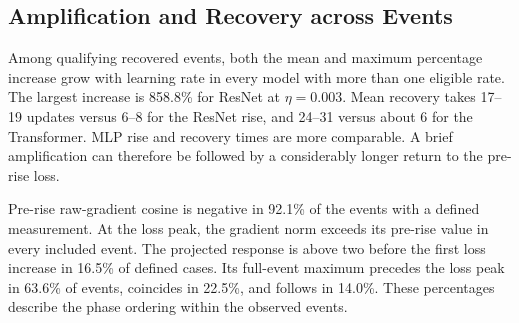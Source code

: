 \subsection{Amplification and Recovery across Events}

Among qualifying recovered events, both the mean and maximum percentage
increase grow with learning rate in every model with more than one eligible
rate. The largest increase is 858.8\% for ResNet at $\eta=0.003$.
Mean recovery takes 17--19 updates versus 6--8 for the ResNet rise,
and 24--31 versus about 6 for the Transformer. MLP rise and recovery
times are more comparable. A brief amplification can therefore be
followed by a considerably longer return to the pre-rise loss.

Pre-rise raw-gradient cosine is negative in 92.1\% of the events with a
defined measurement. At the loss peak, the gradient norm exceeds its
pre-rise value in every included event. The projected response is above
two before the first loss increase in 16.5\% of defined cases.
Its full-event maximum precedes the loss peak in 63.6\% of events,
coincides in 22.5\%, and follows in 14.0\%. These percentages describe
the phase ordering within the observed events.



\begin{table}[tp]
 \caption{Anatomy of recovered spikes with peak increase greater than 10\%.
 Cells report mean $\pm$ sample SD across events; maximum peak increase has
 its own subcolumn. Before denotes a single diagnostic at state $a_i$;
 recovery denotes the event's mean over states $p_i+1,\ldots,c_i$.
 Norm ratios compare loss-peak/pre-rise and recovered/loss-peak endpoints.
 $N$ counts included events; dashes indicate no qualifying event.
 Two initialization events have undefined pre-rise diagnostics, leaving
 46 and 38 observations for those entries in the MLP's middle and highest
 LR rows. No smoothing or averaging across initializations.}
 \label{tab:adam-spike-anatomy}
 \centering
 \footnotesize
 \setlength{\tabcolsep}{1.5pt}
 \renewcommand{\arraystretch}{1.15}
 
\end{table}

